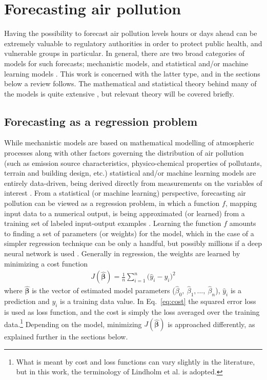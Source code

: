 \section{Forecasting air pollution}

Having the possibility to forecast air pollution levels hours or days ahead can be extremely valuable to regulatory authorities in order to protect public health, and vulnerable groups in particular. In general, there are two broad categories of models for such forecasts; mechanistic models, and statistical and/or machine learning models \cite{ElHarbawi2013}. This work is concerned with the latter type, and in the sections below a review follows. The mathematical and statistical theory behind many of the models is quite extensive \cite{Hastie2009, Montgomery2015, smlbook, LeCun2015}, but relevant theory will be covered briefly.

\subsection{Forecasting as a regression problem}
\label{sec:forecasting}
While mechanistic models are based on mathematical modelling of atmospheric processes along with other factors governing the distribution of air pollution (such as emission source characteristics, physico-chemical properties of pollutants, terrain and building design, etc.) statistical and/or machine learning models are entirely data-driven, being derived directly from measurements on the variables of interest \cite{ElHarbawi2013}. From a statistical (or machine learning) perspective, forecasting air pollution can be viewed as a regression problem, in which a function $f$, mapping input data to a numerical output, is being approximated (or learned) from a training set of labeled input-output examples \cite{smlbook}. Learning the function $f$ amounts to finding a set of parameters (or weights) for the model, which in the case of a simpler regression technique can be only a handful, but possibly millions if a deep neural network is used \cite{smlbook}. Generally in regression, the weights are learned by minimizing a cost function
\begin{align}
J(\bm{\hat{\beta}}) = \frac{1}{n} \sum_{i=1}^{n} \big(\hat{y}_i - y_i \big)^2
\label{eq:cost}
\end{align}
where $\bm{\hat{\beta}}$ is the vector of estimated model parameters ($\hat{\beta}_0, \: \hat{\beta}_1, ..., \: \hat{\beta}_n$), $\hat{y}_i$ is a prediction and $y_i$ is a training data value\cite{smlbook}. In Eq.\ \ref{eq:cost} the squared error loss is used as loss function, and the cost is simply the loss averaged over the training data.\footnote{What is meant by cost and loss functions can vary slightly in the literature, but in this work, the terminology of Lindholm et al. \cite{smlbook} is adopted.} Depending on the model, minimizing $J(\bm{\hat{\beta}})$ is approached differently, as explained further in the sections below. 

